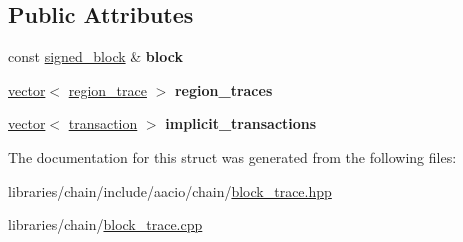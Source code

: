 \subsection*{Public Attributes}
\begin{DoxyCompactItemize}
\item 
\mbox{\label{structaacio_1_1chain_1_1block__trace_a3e555a097a322dae75ca72a844a4466d}} 
const \mbox{\hyperlink{structaacio_1_1chain_1_1signed__block}{signed\+\_\+block}} \& {\bfseries block}
\item 
\mbox{\label{structaacio_1_1chain_1_1block__trace_a4ea9e9911dafe82a002e17621c526518}} 
\mbox{\hyperlink{classstd_1_1vector}{vector}}$<$ \mbox{\hyperlink{structaacio_1_1chain_1_1region__trace}{region\+\_\+trace}} $>$ {\bfseries region\+\_\+traces}
\item 
\mbox{\label{structaacio_1_1chain_1_1block__trace_a3047fbbb87a0607b4d9ce8e046769267}} 
\mbox{\hyperlink{classstd_1_1vector}{vector}}$<$ \mbox{\hyperlink{structaacio_1_1chain_1_1transaction}{transaction}} $>$ {\bfseries implicit\+\_\+transactions}
\end{DoxyCompactItemize}


The documentation for this struct was generated from the following files\+:\begin{DoxyCompactItemize}
\item 
libraries/chain/include/aacio/chain/\mbox{\hyperlink{block__trace_8hpp}{block\+\_\+trace.\+hpp}}\item 
libraries/chain/\mbox{\hyperlink{block__trace_8cpp}{block\+\_\+trace.\+cpp}}\end{DoxyCompactItemize}
